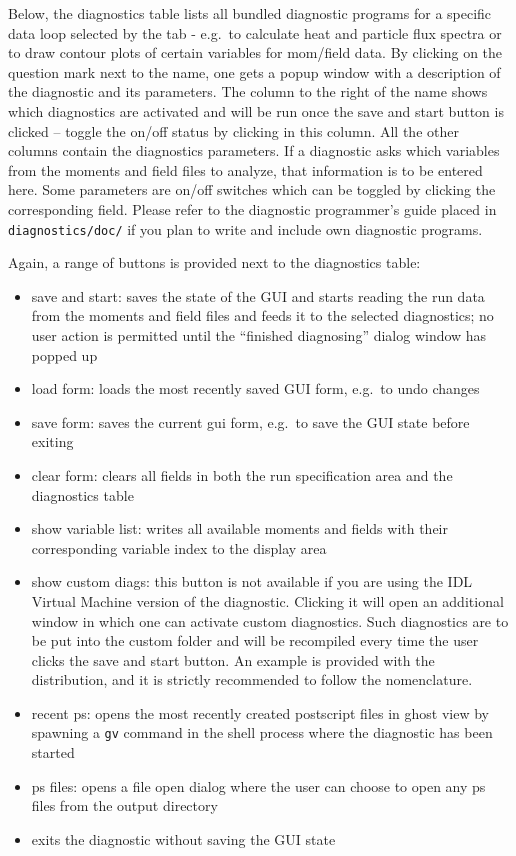 \documentclass[12pt]{article}
\begin{document}
Below, the diagnostics table lists all bundled diagnostic
programs for a specific data loop selected by the tab
- e.g.~to calculate heat and particle flux spectra or 
to draw contour plots of certain variables for mom/field data.
By clicking on the question mark next to the name, one
gets a popup window with a description of the diagnostic and its
parameters. The column to the right of the name shows which
diagnostics are activated and will be run once the save and start
button is clicked -- toggle the on/off status by clicking in this
column. All the other columns contain the diagnostics parameters.
If a diagnostic asks which variables from the moments and field
files to analyze, that information is to be entered here. Some
parameters are on/off switches which can be toggled by clicking
the corresponding field. Please refer to the diagnostic
programmer's guide placed in \verb|diagnostics/doc/| if you plan
to write and include own diagnostic programs.

Again, a range of buttons is provided next to the diagnostics
table:
\begin{itemize}
\item save and start: saves the state of the GUI and starts
reading the run data from the moments and field files and feeds it
to the selected diagnostics; no user action is permitted until the
``finished diagnosing'' dialog window has popped up 
\item load form: loads the most recently saved GUI form, 
e.g.~to undo changes
\item save form: saves the current gui form, e.g.~to save the GUI
state before exiting 
\item clear form: clears all fields in both
the run specification area and the diagnostics table 
\item show
variable list: writes all available moments and fields with their
corresponding variable index to the display area 
\item show custom diags: this button is not available if you 
are using the IDL
Virtual Machine version of the \gene diagnostic. Clicking it will
open an additional window in which one can activate custom
diagnostics. Such diagnostics are to be put into the custom folder
and will be recompiled every time the user clicks the save and
start button. An example is provided with the distribution, and it
is strictly recommended to follow the nomenclature.
\item recent ps: opens the most recently created postscript 
files in ghost view
by spawning a \verb|gv| command in the shell process where the
diagnostic has been started 
\item ps files: opens a file open dialog where the user can 
choose to open any ps files from the
output directory 
\item exits the diagnostic without saving the GUI state
\end{itemize}
\end{document}
